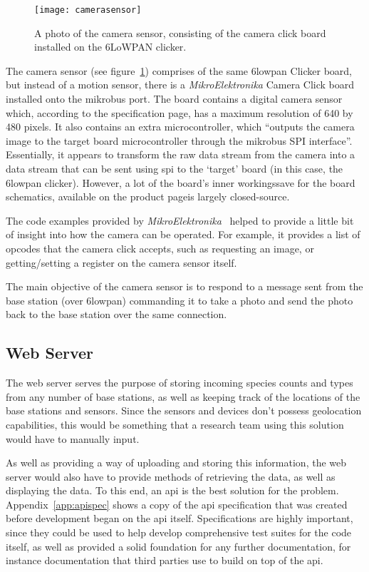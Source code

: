 \begin{figure}
  \centering
  \texttt{[image: camerasensor]}
  \caption{A photo of the camera sensor, consisting of the camera click board
  installed on the 6LoWPAN clicker.}
  \label{fig:camerasensor}
\end{figure}
The camera sensor (see figure~\ref{fig:camerasensor}) comprises of the same
\gls{6lowpan} Clicker board, but instead of a motion sensor, there is a
\textit{MikroElektronika} Camera Click board~\cite{cameraclick} installed
onto the \gls{mikrobus} port. The board contains a digital camera sensor
which, according to the specification page, has a maximum resolution of 640
by 480 pixels. It also contains an extra microcontroller, which ``outputs the
camera image to the target board microcontroller through the \gls{mikrobus}
SPI interface''. Essentially, it appears to transform the raw data stream
from the camera into a data stream that can be sent using \acrfull{spi} to
the `target' board (in this case, the \gls{6lowpan} clicker). However, a lot
of the board's inner workings\textemdash{}save for the board schematics,
available on the product page\textemdash{}is largely closed-source.

The code examples provided by
\textit{MikroElektronika}~\cite{cameraclickexamples} helped to provide a
little bit of insight into how the camera can be operated. For example, it
provides a list of \glspl{opcode} that the camera click accepts, such as
requesting an image, or getting/setting a register on the camera sensor
itself.

The main objective of the camera sensor is to respond to a message sent from
the base station (over \gls{6lowpan}) commanding it to take a photo and send
the photo back to the base station over the same connection.

\subsection{Web Server}
The web server serves the purpose of storing incoming species counts and
types from any number of base stations, as well as keeping track of the
locations of the base stations and sensors. Since the sensors and devices
don't possess geolocation capabilities, this would be something that a
research team using this solution would have to manually input.

As well as providing a way of uploading and storing this information, the web
server would also have to provide methods of retrieving the data, as well as
displaying the data. To this end, an \acrshort{api} is the best solution for
the problem. Appendix~\ref{app:apispec} shows a copy of the \acrshort{api}
specification that was created before development began on the \acrshort{api}
itself. Specifications are highly important, since they could be used to help
develop comprehensive test suites for the code itself, as well as provided a
solid foundation for any further documentation, for instance documentation
that third parties use to build on top of the \acrshort{api}.

